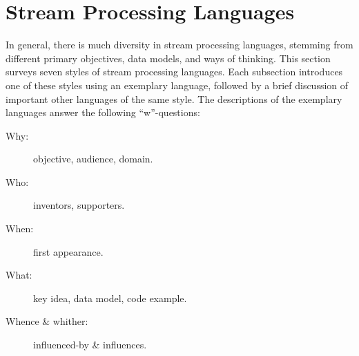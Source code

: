 \section{Stream Processing Languages}\label{sec:languages}

In general, there is much diversity in stream processing languages,
stemming from different primary objectives, data models, and ways of
thinking. This section surveys seven styles of stream processing languages.  Each
subsection introduces one of these styles using an exemplary language, followed by a
brief discussion of important other languages of the same style. The
descriptions of the exemplary languages answer the following
``w''-questions:

\begin{description}
  \item[Why:] objective, audience, domain.
  \item[Who:] inventors, supporters.
  \item[When:] first appearance.
  \item[What:] key idea, data model, code example.
  \item[Whence \& whither:] influenced-by \& influences.
\end{description}










